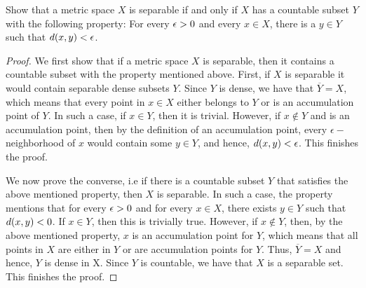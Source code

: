 \begin{question}
    Show that a metric space $X$ is separable if and only if $X$ has a countable subset $Y$ with the following property: For every $\epsilon > 0$ and every $x \in X$, there is a $y \in Y$ such that $d(x,y) < \epsilon$.
    \label{section1.3-13}
\end{question}
\begin{proof}
    We first show that if a metric space $X$ is separable, then it contains a countable subset with the property mentioned above. First, if $X$ is separable it would contain separable dense subsets $Y$. Since $Y$ is dense, we have that $\overline{Y} = X$, which means that every point in $x \in X$ either belongs to $Y$ or is an accumulation point of $Y$. In such a case, if $x \in Y$, then it is trivial. However, if $x \notin Y$ and is an accumulation point, then by the definition of an accumulation point, every $\epsilon-$neighborhood of $x$ would contain some $y \in Y$, and hence, $d(x,y) < \epsilon$. This finishes the proof.

    We now prove the converse, i.e if there is a countable subset $Y$ that satisfies the above mentioned property, then $X$ is separable. In such a case, the property mentions that for every $\epsilon > 0$ and for every $x \in X$, there exists $y \in Y$ such that $d(x,y) < 0$. If $x \in Y$, then this is trivially true. However, if $x \notin Y$, then, by the above mentioned property, $x$ is an accumulation point for $Y$, which means that all points in $X$ are either in $Y$ or are accumulation points for $Y$. Thus, $\overline{Y} = X$ and hence, $Y$ is dense in X. Since $Y$ is countable, we have that $X$ is a separable set. This finishes the proof.
    \end{proof}

